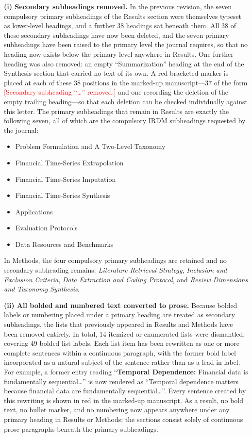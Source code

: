 \documentclass[11pt,a4paper]{article}
\begin{document}
\vspace{0.5em}
\noindent\textbf{(i) Secondary subheadings removed.} In the previous revision, the seven compulsory primary subheadings of the Results section were themselves typeset as lower-level headings, and a further 38 headings sat beneath them. All 38 of these secondary subheadings have now been deleted, and the seven primary subheadings have been raised to the primary level the journal requires, so that no heading now exists below the primary level anywhere in Results. One further heading was also removed: an empty ``Summarization'' heading at the end of the Synthesis section that carried no text of its own. A red bracketed marker is placed at each of these 38 positions in the marked-up manuscript---37 of the form \textcolor{red}{[Secondary subheading ``\ldots'' removed.]} and one recording the deletion of the empty trailing heading---so that each deletion can be checked individually against this letter. The primary subheadings that remain in Results are exactly the following seven, all of which are the compulsory IRDM subheadings requested by the journal:

\begin{itemize}
  \item Problem Formulation and A Two-Level Taxonomy
  \item Financial Time-Series Extrapolation
  \item Financial Time-Series Imputation
  \item Financial Time-Series Synthesis
  \item Applications
  \item Evaluation Protocols
  \item Data Resources and Benchmarks
\end{itemize}

\noindent In Methods, the four compulsory primary subheadings are retained and no secondary subheading remains: \textit{Literature Retrieval Strategy}, \textit{Inclusion and Exclusion Criteria}, \textit{Data Extraction and Coding Protocol}, and \textit{Review Dimensions and Taxonomy Synthesis}.

\vspace{0.5em}
\noindent\textbf{(ii) All bolded and numbered text converted to prose.} Because bolded labels or numbering placed under a primary heading are treated as secondary subheadings, the lists that previously appeared in Results and Methods have been removed entirely. In total, 14 itemized or enumerated lists were dismantled, covering 49 bolded list labels. Each list item has been rewritten as one or more complete sentences within a continuous paragraph, with the former bold label incorporated as a natural subject of the sentence rather than as a lead-in label. For example, a former entry reading ``\textbf{Temporal Dependence:} Financial data is fundamentally sequential\ldots'' is now rendered as ``Temporal dependence matters because financial data are fundamentally sequential\ldots''. Every sentence created by this rewriting is shown in red in the marked-up manuscript. As a result, no bold text, no bullet marker, and no numbering now appears anywhere under any primary heading in Results or Methods; the sections consist solely of continuous prose paragraphs beneath the primary subheadings.
\end{document}
